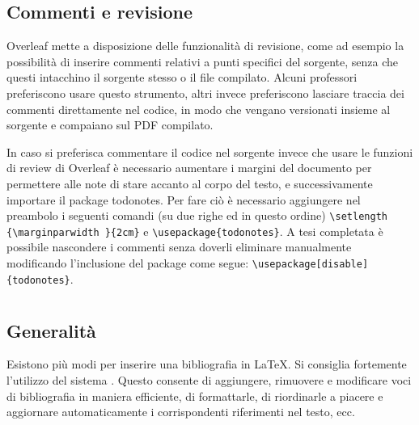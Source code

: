 \documentclass[12pt]{report}
\begin{document}
\subsection{Commenti e revisione}

Overleaf mette a disposizione delle funzionalità di revisione, come ad esempio la possibilità di inserire commenti relativi a punti specifici del sorgente, senza che questi intacchino il sorgente stesso o il file compilato. Alcuni professori preferiscono usare questo strumento, altri invece preferiscono lasciare traccia dei commenti direttamente nel codice, in modo che vengano versionati insieme al sorgente e compaiano sul PDF compilato.

In caso si preferisca commentare il codice nel sorgente invece che usare le funzioni di review di Overleaf è necessario aumentare i margini del documento per permettere alle note di stare accanto al corpo del testo, e successivamente importare il package todonotes. Per fare ciò è necessario aggiungere nel preambolo i seguenti comandi (su due righe ed in questo ordine) \verb|\setlength {\marginparwidth }{2cm}| e \verb|\usepackage{todonotes}|. A tesi completata è possibile nascondere i commenti senza doverli eliminare manualmente modificando l'inclusione del package come segue: \verb|\usepackage[disable]{todonotes}|.


\section{}
\label{sec:bibtex}

\subsection{Generalit\`a}

Esistono più modi per inserire una bibliografia in \LaTeX. Si consiglia fortemente l'utilizzo del sistema . Questo consente di aggiungere, rimuovere e modificare voci di bibliografia in maniera efficiente, di formattarle, di riordinarle a piacere e aggiornare automaticamente i corrispondenti riferimenti nel testo, ecc.
\end{document}
